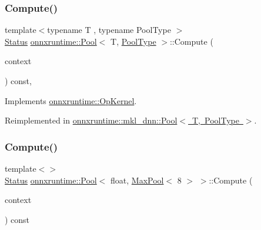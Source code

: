\subsubsection{\texorpdfstring{Compute()}{Compute()}\hspace{0.1cm}{\footnotesize\ttfamily [1/2]}}
{\footnotesize\ttfamily template$<$typename T , typename Pool\+Type $>$ \\
\mbox{\hyperlink{classonnxruntime_1_1common_1_1Status}{Status}} \mbox{\hyperlink{classonnxruntime_1_1Pool}{onnxruntime\+::\+Pool}}$<$ T, \mbox{\hyperlink{namespaceonnxruntime_aa4ff52f19ea8c4d3e4ce3ffbabbc7060}{Pool\+Type}} $>$\+::Compute (\begin{DoxyParamCaption}\item[{\mbox{\hyperlink{classonnxruntime_1_1OpKernelContext}{Op\+Kernel\+Context}} $\ast$}]{context }\end{DoxyParamCaption}) const\hspace{0.3cm}{\ttfamily [override]}, {\ttfamily [virtual]}}



Implements \mbox{\hyperlink{classonnxruntime_1_1OpKernel_a9eca8656a78b1b3ab9d3351a12798650}{onnxruntime\+::\+Op\+Kernel}}.



Reimplemented in \mbox{\hyperlink{classonnxruntime_1_1mkl__dnn_1_1Pool_aff8a05a3aec92d9e68b366ead56de08f}{onnxruntime\+::mkl\+\_\+dnn\+::\+Pool$<$ T, Pool\+Type $>$}}.

\mbox{\label{classonnxruntime_1_1Pool_a10f34e111b6792c1e543610c4c91765e}} 
\subsubsection{\texorpdfstring{Compute()}{Compute()}\hspace{0.1cm}{\footnotesize\ttfamily [2/2]}}
{\footnotesize\ttfamily template$<$$>$ \\
\mbox{\hyperlink{classonnxruntime_1_1common_1_1Status}{Status}} \mbox{\hyperlink{classonnxruntime_1_1Pool}{onnxruntime\+::\+Pool}}$<$ float, \mbox{\hyperlink{classonnxruntime_1_1MaxPool}{Max\+Pool}}$<$ 8 $>$ $>$\+::Compute (\begin{DoxyParamCaption}\item[{\mbox{\hyperlink{classonnxruntime_1_1OpKernelContext}{Op\+Kernel\+Context}} $\ast$}]{context }\end{DoxyParamCaption}) const\hspace{0.3cm}{\ttfamily [virtual]}}



